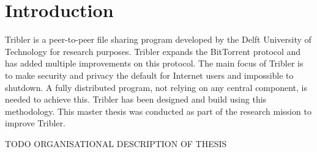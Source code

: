 \chapter{Introduction}
\label{chp:introduction}
Tribler is a peer-to-peer file sharing program developed by the Delft University of Technology for research purposes.
Tribler expands the BitTorrent protocol and has added multiple improvements on this protocol.
The main focus of Tribler is to make security and privacy the default for Internet users and impossible to shutdown.
A fully distributed program, not relying on any central component, is needed to achieve this.
Tribler has been designed and build using this methodology\cite{Pouwelse-tribler}\cite{Bakker-tribler}.
This master thesis was conducted as part of the research mission to improve Tribler.

\vspace{1\baselineskip}

\noindent
TODO ORGANISATIONAL DESCRIPTION OF THESIS


